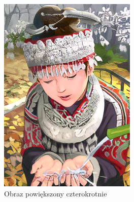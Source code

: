 \begin{figure}[ht]
\begin{minipage}[t]{0.3\linewidth}
        \includegraphics[width=\linewidth]{Rozdziały/02.Podstawy_teoretyczne/Obrazy/comic_ESRGAN_x4.png}
        \caption{Obraz powiększony czterokrotnie}
        \label{fig:image2}
    \end{minipage}
    \hspace{0.5cm}
    \begin{minipage}[t]{0.3\linewidth}

\end{minipage}
\end{figure}
